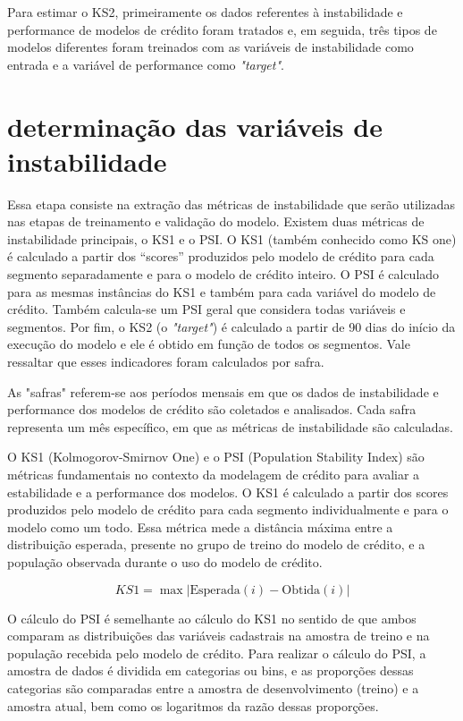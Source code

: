 Para estimar o KS2, primeiramente os dados referentes à instabilidade e performance de modelos de crédito foram tratados e, em seguida, três tipos de modelos diferentes foram treinados com as variáveis de instabilidade como entrada e a variável de performance como \emph{"target"}.
    
\section{determinação das variáveis de instabilidade}

Essa etapa consiste na extração das métricas de instabilidade que serão utilizadas nas etapas de  treinamento e validação do modelo. Existem duas métricas de instabilidade principais, o KS1 e o PSI. O KS1 (também conhecido como KS one)  é calculado a partir dos “scores” produzidos pelo modelo de crédito para cada segmento separadamente e para o modelo de crédito inteiro. O PSI é calculado para as mesmas instâncias do KS1 e também para cada variável do modelo de crédito. Também calcula-se um PSI geral que considera todas variáveis e segmentos. Por fim, o KS2 (o \emph{"target"}) é calculado a partir de 90 dias do início da execução do modelo e ele é obtido em função de todos os segmentos. Vale ressaltar que esses indicadores foram calculados por safra.

As "safras" referem-se aos períodos mensais em que os dados de instabilidade e performance dos modelos de crédito são coletados e analisados. Cada safra representa um mês específico, em que as métricas de instabilidade são calculadas.

O KS1 (Kolmogorov-Smirnov One) e o PSI (Population Stability Index) são métricas fundamentais no contexto da modelagem de crédito para avaliar a estabilidade e a performance dos modelos. O KS1 é calculado a partir dos scores produzidos pelo modelo de crédito para cada segmento individualmente e para o modelo como um todo. Essa métrica mede a distância máxima entre a distribuição esperada, presente no grupo de treino do modelo de crédito, e a população observada durante o uso do modelo de crédito.

\begin{equation}
KS1 = \max \left| \text{Esperada}(i) - \text{Obtida}(i) \right|
\end{equation}

O cálculo do PSI é semelhante ao cálculo do KS1 no sentido de que ambos comparam as distribuições das variáveis cadastrais na amostra de treino e na população recebida pelo modelo de crédito. Para realizar o cálculo do PSI, a amostra de dados é dividida em categorias ou bins, e as proporções dessas categorias são comparadas entre a amostra de desenvolvimento (treino) e a amostra atual, bem como os logaritmos da razão dessas proporções.

